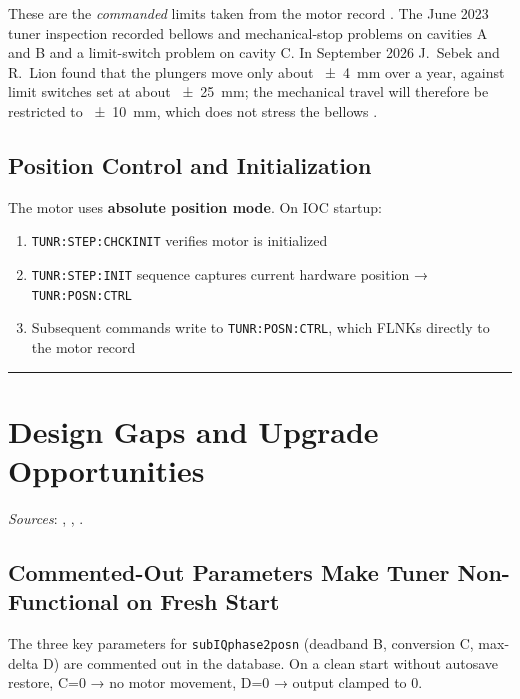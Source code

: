 These are the \emph{commanded} limits taken from the motor record . The June
2023 tuner inspection recorded bellows and mechanical-stop problems on cavities A and
B and a limit-switch problem on cavity C. In September 2026 J.~Sebek and R.~Lion
found that the plungers move only about \qty{\pm 4}{\milli\meter} over a year,
against limit switches set at about \qty{\pm 25}{\milli\meter}; the mechanical travel
will therefore be restricted to \qty{\pm 10}{\milli\meter}, which does not stress the
bellows .

\subsection{Position Control and Initialization}\label{sec:position-init}


The motor uses \textbf{absolute position mode}. On IOC startup:

\begin{enumerate}
\def\labelenumi{\arabic{enumi}.}
\tightlist
\item
  \texttt{TUNR:\allowbreak{}STEP:\allowbreak{}CHCKINIT} verifies motor is initialized
\item
  \texttt{TUNR:\allowbreak{}STEP:\allowbreak{}INIT} sequence captures current hardware position → \texttt{TUNR:\allowbreak{}POSN:\allowbreak{}CTRL}
\item
  Subsequent commands write to \texttt{TUNR:\allowbreak{}POSN:\allowbreak{}CTRL}, which FLNKs directly to the motor record
\end{enumerate}

\begin{center}\rule{0.5\linewidth}{0.5pt}\end{center}

\section{Design Gaps and Upgrade Opportunities}\label{sec:gaps}

\emph{Sources}: , , .


\subsection{Commented-Out Parameters Make Tuner Non-Functional on Fresh Start}\label{sec:gap-commented}


The three key parameters for \texttt{subIQphase2posn} (deadband B, conversion C, max-delta D) are commented out in the database. On a clean start without autosave restore, C=0 → no motor movement, D=0 → output clamped to 0.


